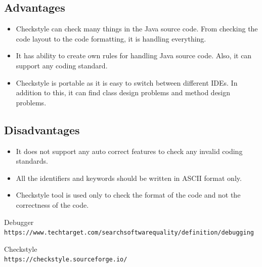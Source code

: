 \documentclass[12pt]{report}
\begin{document}
\subsection{\Large Advantages}

\begin{itemize}
    \item Checkstyle can check many things in the Java source code. From checking the code layout to the code formatting, it is handling everything.
    \item It has ability to create own rules for handling Java source code. Also, it can support any coding standard.
    \item Checkstyle is portable as it is easy to switch between different IDEs. In addition to this, it can find class design problems and method design problems.

\end{itemize}

\subsection{\Large Disadvantages}
\begin{itemize}
    \item It does not support any auto correct features to check any invalid coding standards.
    \item All the identifiers and keywords should be written in ASCII format only.
    \item Checkstyle tool is used only to check the format of the code and not the correctness of the code.
\end{itemize}









\begin{thebibliography}{9}
Debugger
\\\texttt{https://www.techtarget.com/searchsoftwarequality/definition/debugging}

Checkstyle
\\\texttt{https://checkstyle.sourceforge.io/}



\end{thebibliography}
\end{document}
